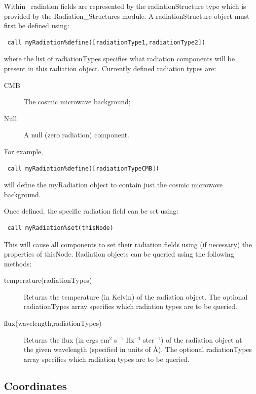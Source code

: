 Within \glc\ radiation fields are represented by the {\normalfont \ttfamily radiationStructure} type which is provided by the {\normalfont \ttfamily Radiation\_Structures} module. A {\normalfont \ttfamily radiationStructure} object must first be defined using:
\begin{verbatim}
 call myRadiation%define([radiationType1,radiationType2])
\end{verbatim}
where the list of {\normalfont \ttfamily radiationType}s specifies what radiation components will be present in this radiation object. Currently defined radiation types are:
\begin{description}
 \item[{\normalfont \ttfamily CMB}] The cosmic microwave background;
 \item[{\normalfont \ttfamily Null}] A null (zero radiation) component.
\end{description}
For example,
\begin{verbatim}
 call myRadiation%define([radiationTypeCMB])
\end{verbatim}
will define the {\normalfont \ttfamily myRadiation} object to contain just the cosmic microwave background.

Once defined, the specific radiation field can be set using:
\begin{verbatim}
 call myRadiation%set(thisNode)
\end{verbatim}
This will cause all components to set their radiation fields using (if necessary) the properties of {\normalfont \ttfamily thisNode}. Radiation objects can be queried using the following methods:
\begin{description}
 \item[{\normalfont \ttfamily temperature(radiationTypes)}] Returns the temperature (in Kelvin) of the radiation object. The optional {\normalfont \ttfamily radiationTypes} array specifies which radiation types are to be queried.
 \item[{\normalfont \ttfamily flux(wavelength,radiationTypes)}] Returns the flux (in ergs cm$^2$ s$^{-1}$ Hz$^{-1}$ ster$^{-1}$) of the radiation object at the given {\normalfont \ttfamily wavelength} (specified in units of \AA). The optional {\normalfont \ttfamily radiationTypes} array specifies which radiation types are to be queried.
\end{description}

\subsection{Coordinates}\label{sec:Coordinates}

